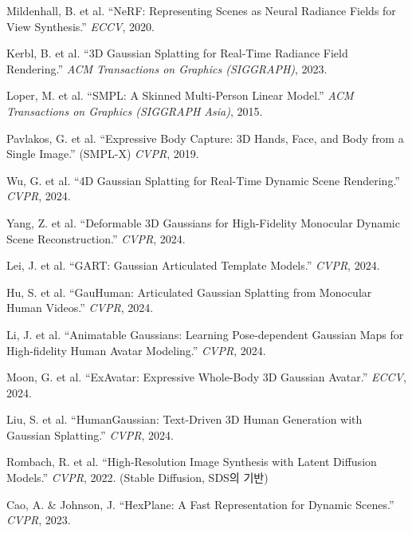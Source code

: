 \documentclass[11pt, a4paper]{report}
\begin{document}
\begin{enumerate}[leftmargin=*, label={[\arabic*]}]
  \item Mildenhall, B. et al. ``NeRF: Representing Scenes as Neural Radiance Fields for View Synthesis.'' \textit{ECCV}, 2020.

  \item Kerbl, B. et al. ``3D Gaussian Splatting for Real-Time Radiance Field Rendering.'' \textit{ACM Transactions on Graphics (SIGGRAPH)}, 2023.

  \item Loper, M. et al. ``SMPL: A Skinned Multi-Person Linear Model.'' \textit{ACM Transactions on Graphics (SIGGRAPH Asia)}, 2015.

  \item Pavlakos, G. et al. ``Expressive Body Capture: 3D Hands, Face, and Body from a Single Image.'' (SMPL-X) \textit{CVPR}, 2019.

  \item Wu, G. et al. ``4D Gaussian Splatting for Real-Time Dynamic Scene Rendering.'' \textit{CVPR}, 2024.

  \item Yang, Z. et al. ``Deformable 3D Gaussians for High-Fidelity Monocular Dynamic Scene Reconstruction.'' \textit{CVPR}, 2024.

  \item Lei, J. et al. ``GART: Gaussian Articulated Template Models.'' \textit{CVPR}, 2024.

  \item Hu, S. et al. ``GauHuman: Articulated Gaussian Splatting from Monocular Human Videos.'' \textit{CVPR}, 2024.

  \item Li, J. et al. ``Animatable Gaussians: Learning Pose-dependent Gaussian Maps for High-fidelity Human Avatar Modeling.'' \textit{CVPR}, 2024.

  \item Moon, G. et al. ``ExAvatar: Expressive Whole-Body 3D Gaussian Avatar.'' \textit{ECCV}, 2024.

  \item Liu, S. et al. ``HumanGaussian: Text-Driven 3D Human Generation with Gaussian Splatting.'' \textit{CVPR}, 2024.

  \item Rombach, R. et al. ``High-Resolution Image Synthesis with Latent Diffusion Models.'' \textit{CVPR}, 2022. (Stable Diffusion, SDS의 기반)

  \item Cao, A. \& Johnson, J. ``HexPlane: A Fast Representation for Dynamic Scenes.'' \textit{CVPR}, 2023.


\end{enumerate}
\end{document}
